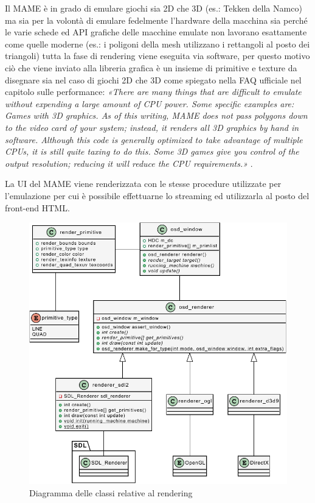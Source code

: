 Il MAME è in grado di emulare giochi sia 2D che 3D (es.: Tekken della Namco) ma sia per la volontà di emulare fedelmente l'hardware della macchina sia perché le varie schede ed API grafiche delle macchine emulate non lavorano esattamente come quelle moderne (es.: i poligoni della mesh utilizzano i rettangoli al posto dei triangoli) tutta la fase di rendering viene eseguita via software, per questo motivo ciò che viene inviato alla libreria grafica è un insieme di primitive e texture da disegnare sia nel caso di giochi 2D che 3D come spiegato nella FAQ ufficiale nel capitolo sulle performance: \textit{«There are many things that are difficult to emulate without expending a large amount of CPU power. Some specific examples are: Games with 3D graphics. As of this writing, MAME does not pass polygons down to the video card of your system; instead, it renders all 3D graphics by hand in software. Although this code is generally optimized to take advantage of multiple CPUs, it is still quite taxing to do this. Some 3D games give you control of the output resolution; reducing it will reduce the CPU requirements.»} \parencite{MAME_FAQ_Performance}.

La UI del MAME viene renderizzata con le stesse procedure utilizzate per l'emulazione per cui è possibile effettuarne lo streaming ed utilizzarla al posto del front-end HTML.

\begin{figure}[H]
	\includegraphics[width=\linewidth]{immagini/class_renderingSDLFull}
	\caption{Diagramma delle classi relative al rendering}
	\label{fig:class_renderingSDLFull}
\end{figure}

